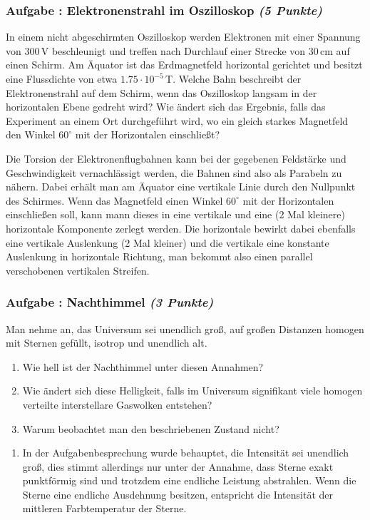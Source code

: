 \documentclass[12pt,a4paper]{article}
\newcommand{\ee}[1]{\cdot 10^{#1}}
\newcommand{\unit}[1]{\,\mathrm{#1}}
\newenvironment{abcenum}{\renewcommand{\labelenumi}{(\alph{enumi})} \begin{enumerate}}{\end{enumerate}\renewcommand{\labelenumi}{\theenumi .}}
\newcounter{numlabel}
\newenvironment{problem}[2]{\stepcounter{numlabel} \vspace{1ex} \subsubsection*{Aufgabe \the\value{numlabel}: #1 \emph{(#2 Punkte)}} \renewcommand{\Currentlabel}{Aufgabe \the\value{numlabel}: #1}}{

}
\begin{document}
\begin{problem}{Elektronenstrahl im Oszilloskop}{5}
In einem nicht abgeschirmten Oszilloskop werden Elektronen mit einer Spannung von $300 \unit{V}$ beschleunigt und treffen nach Durchlauf einer Strecke von $30 \unit{cm}$ auf einen Schirm. Am Äquator ist das Erdmagnetfeld horizontal gerichtet und besitzt eine Flussdichte von etwa $1.75\ee{-5} \unit{T}$. Welche Bahn beschreibt der Elektronenstrahl auf dem Schirm, wenn das Oszilloskop langsam in der horizontalen Ebene gedreht wird? Wie ändert sich das Ergebnis, falls das Experiment an einem Ort durchgeführt wird, wo ein gleich starkes Magnetfeld den Winkel $60^\circ$ mit der Horizontalen einschließt?
\begin{solution}
Die Torsion der Elektronenflugbahnen kann bei der gegebenen Feldstärke und Geschwindigkeit vernachlässigt werden, die Bahnen sind also als Parabeln zu nähern. Dabei erhält man am Äquator eine vertikale Linie durch den Nullpunkt des Schirmes. Wenn das Magnetfeld einen Winkel $60^\circ$ mit der Horizontalen einschließen soll, kann mann dieses in eine vertikale und eine (2 Mal kleinere) horizontale Komponente zerlegt werden. Die horizontale bewirkt dabei ebenfalls eine vertikale Auslenkung (2 Mal kleiner) und die vertikale eine konstante Auslenkung in horizontale Richtung, man bekommt also einen parallel verschobenen vertikalen Streifen.
\end{solution}
\end{problem}


\begin{problem}{Nachthimmel}{3}
Man nehme an, das Universum sei unendlich groß, auf großen Distanzen homogen mit Sternen gefüllt, isotrop und unendlich alt.
\begin{abcenum}
\item Wie hell ist der Nachthimmel unter diesen Annahmen?
\item Wie ändert sich diese Helligkeit, falls im Universum signifikant viele homogen verteilte interstellare Gaswolken entstehen?
\item Warum beobachtet man den beschriebenen Zustand nicht?
\end{abcenum}
\begin{solution}
\begin{abcenum}
\item In der Aufgabenbesprechung wurde behauptet, die Intensität sei unendlich groß, dies stimmt allerdings nur unter der Annahme, dass Sterne exakt punktförmig sind und trotzdem eine endliche Leistung abstrahlen. Wenn die Sterne eine endliche Ausdehnung besitzen, entspricht die Intensität der mittleren Farbtemperatur der Sterne.
\end{abcenum}
\end{solution}
\end{problem}
\end{document}
